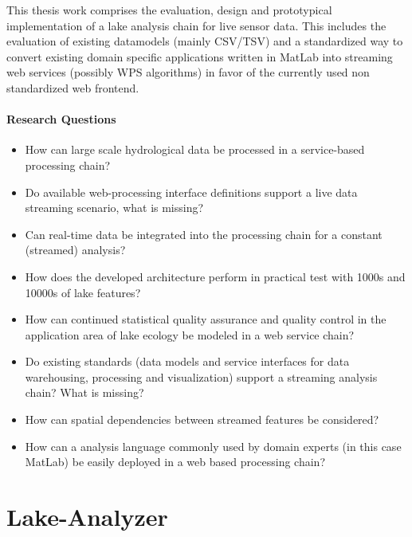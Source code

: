     This thesis work comprises the evaluation, design and prototypical implementation of a lake analysis chain for live sensor data.
    This includes the evaluation of existing datamodels (mainly CSV/TSV) and a standardized way to convert existing domain specific applications written in MatLab into streaming web services (possibly WPS algorithms) in favor of the currently used non standardized web frontend.

    \paragraph*{Research Questions}
    \begin{itemize}
        \item How can large scale hydrological data be processed in a service-based processing chain?
        \item Do available web-processing interface definitions support a live data streaming scenario, what is missing?
        \item Can real-time data be integrated into the processing chain for a constant (streamed) analysis?
        \item How does the developed architecture perform in practical test with 1000s and 10000s of lake features?
        \item How can continued statistical quality assurance and quality control in the application area of lake ecology be modeled in a web service chain?
        \item Do existing standards (data models and service interfaces for data warehousing, processing and visualization) support a streaming analysis chain? What is missing?
        \item How can spatial dependencies between streamed features be considered?
        \item How can a analysis language commonly used by domain experts (in this case MatLab) be easily deployed in a web based processing chain?
    \end{itemize}


\section{Lake-Analyzer}

